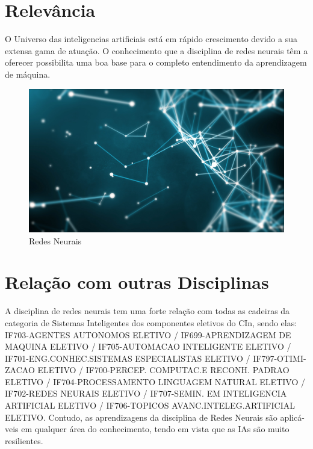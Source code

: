 \documentclass{article}
\begin{document}
\section{Relevância}
O Universo das inteligencias artificiais está em rápido crescimento
devido a sua extensa gama de atuação. O conhecimento que a disciplina de redes neurais têm a oferecer possibilita uma boa base para o completo entendimento da aprendizagem de máquina.


\begin{figure}[h!]
\centering
\includegraphics[scale=0.1]{redesneurais.jpg}
\caption{Redes Neurais}
\label{fig:redesneurais}
\end{figure}

\section{Relação com outras Disciplinas}
A disciplina de redes neurais tem uma forte relação com todas as cadeiras da categoria de Sistemas Inteligentes dos componentes eletivos do CIn, sendo elas: IF703-AGENTES AUTONOMOS ELETIVO
/ IF699-APRENDIZAGEM DE MAQUINA ELETIVO / IF705-AUTOMACAO INTELIGENTE ELETIVO / IF701-ENG.CONHEC.SISTEMAS ESPECIALISTAS ELETIVO / IF797-OTIMI- ZACAO ELETIVO / IF700-PERCEP. COMPUTAC.E RECONH. PADRAO ELETIVO / IF704-PROCESSAMENTO LINGUAGEM NATURAL ELETIVO / IF702-REDES NEURAIS ELETIVO / IF707-SEMIN. EM INTELIGENCIA ARTIFICIAL ELETIVO / IF706-TOPICOS AVANC.INTELEG.ARTIFICIAL ELETIVO. Contudo, as aprendizagens da disciplina de Redes Neurais são aplicá- veis em qualquer área do conhecimento, tendo em vista que as IAs são muito resilientes.




\end{document}
